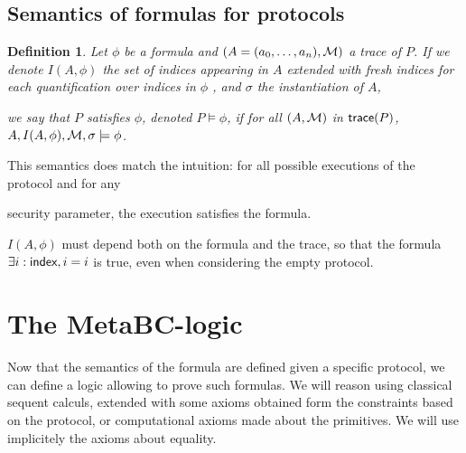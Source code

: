 \documentclass[a4paper]{article}
\newtheorem{definition}{Definition}
\theoremstyle{remark}
\begin{document}
\subsection{Semantics of formulas for protocols}

\begin{definition}
  Let $\phi$ be a formula and $(A=(a_0,\dots,a_n),\mathcal{M})$ a trace of $P$. If we denote $I(A,\phi)$ the set of indices appearing in $A$ extended with fresh indices for each quantification over indices in $\phi$ , and $\sigma$ the instantiation of $A$,

we say that $P$ satisfies $\phi$, denoted $P \models \phi$, if for all $(A,\mathcal{M})$ in $\textsf{trace}(P)$, $A, I(A,\phi), \mathcal{M}, \sigma \models \phi$.

\end{definition}

This semantics does match the intuition: for all possible executions of the protocol and for any

security parameter, the execution satisfies the formula.

$I(A,\phi)$ must depend both on the formula and the trace, so that the formula $\exists i:\textsf{index}, i=i$ is true, even when considering the empty protocol.


\section{The MetaBC-logic}

Now that the semantics of the formula are defined given a specific protocol, we can define a logic allowing to prove such formulas. We will reason using classical sequent calculs, extended with some axioms obtained form the constraints based on the protocol, or computational axioms made about the primitives. We will use implicitely the axioms about equality.
\end{document}
